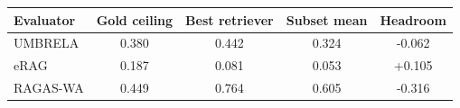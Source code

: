 \begin{tabular}{lcccc}
\toprule
Evaluator & Gold ceiling & Best retriever & Subset mean & Headroom \\
\midrule
UMBRELA & 0.380 & 0.442 & 0.324 & -0.062 \\
eRAG & 0.187 & 0.081 & 0.053 & +0.105 \\
RAGAS-WA & 0.449 & 0.764 & 0.605 & -0.316 \\
\bottomrule
\end{tabular}
